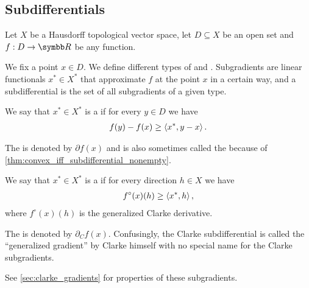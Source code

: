 \subsection{Subdifferentials}\label{sec:subdifferentials}

Let \( X \) be a Hausdorff topological vector space, let \( D \subseteq X \) be an open set and \( f: D \to \BB{R} \) be any function.

\begin{definition}\label{def:subdifferentials}
  We fix a point \( x \in D \). We define different types of  and . Subgradients are linear functionals \( x^* \in X^* \) that approximate \( f \) at the point \( x \) in a certain way, and a subdifferential is the set of all subgradients of a given type.

  \begin{defenum}
    \item\label{def:subdifferentials/convex}\cite[59]{Clarke2013} We say that \( x^* \in X^* \) is a  if for every \( y \in D \) we have
    \begin{align*}
      f(y) - f(x) \geq \left\langle x^*, y - x \right\rangle.
    \end{align*}

    The  is denoted by \( \partial f(x) \) and is also sometimes called the  because of \cref{thm:convex_iff_subdifferential_nonempty}.

    \item\label{def:subdifferentials/clarke}\cite[definition 10.3]{Clarke2013} We say that \( x^* \in X^* \) is a  if for every direction \( h \in X \) we have
    \begin{align*}
      f^\circ(x)(h) \geq \left\langle x^*, h \right\rangle,
    \end{align*}
    where \( f^\circ(x)(h) \) is the generalized Clarke derivative.

    The  is denoted by \( \partial_C f(x) \). Confusingly, the Clarke subdifferential is called the \enquote{generalized gradient} by Clarke himself with no special name for the Clarke subgradients.

    See \cref{sec:clarke_gradients} for properties of these subgradients.


\end{defenum}
\end{definition}
